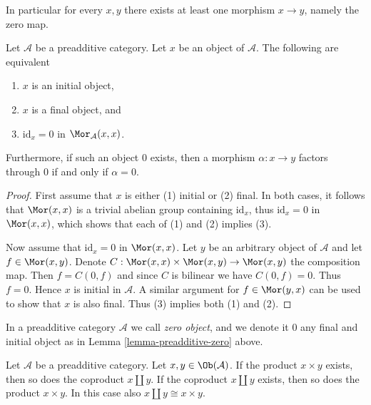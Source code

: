 \noindent
In particular for every $x, y$ there exists at least
one morphism $x \to y$, namely the zero map.

\begin{lemma}
\label{lemma-preadditive-zero}
Let $\mathcal{A}$ be a preadditive category.
Let $x$ be an object of $\mathcal{A}$.
The following are equivalent
\begin{enumerate}
\item $x$ is an initial object,
\item $x$ is a final object, and
\item $\text{id}_x = 0$ in $\Mor_\mathcal{A}(x, x)$.
\end{enumerate}
Furthermore, if such an object $0$ exists, then a morphism
$\alpha : x \to y$ factors through $0$ if and only if $\alpha = 0$.
\end{lemma}

\begin{proof}
First assume that $x$ is either (1) initial or (2) final.
In both cases, it follows that $\Mor(x,x)$ is a trivial abelian group
containing $\text{id}_x$, thus $\text{id}_x = 0$ in
$\Mor(x, x)$, which shows that each of (1) and (2) implies (3).

\medskip\noindent
Now assume that $\text{id}_x = 0$ in $\Mor(x,x)$. Let $y$
be an arbitrary object of $\mathcal{A}$ and let $f \in \Mor(x ,y)$.
Denote $C : \Mor(x,x) \times \Mor(x,y) \to \Mor(x,y)$ the composition map.
Then $f = C(0, f)$ and since $C$ is bilinear we have $C(0, f) = 0$.
Thus $f = 0$. Hence $x$ is initial in $\mathcal{A}$.
A similar argument for $f \in \Mor(y, x)$ can be used to show that
$x$ is also final. Thus (3) implies both (1) and (2).
\end{proof}

\begin{definition}
\label{definition-zero-object}
In a preadditive category $\mathcal{A}$ we call
{\it zero object}, and we denote it $0$
any final and initial object as in Lemma \ref{lemma-preadditive-zero} above.
\end{definition}

\begin{lemma}
\label{lemma-preadditive-direct-sum}
Let $\mathcal{A}$ be a preadditive category.
Let $x, y \in \Ob(\mathcal{A})$.
If the product $x \times y$ exists, then so does
the coproduct $x \amalg y$.
If the coproduct $x \amalg y$ exists, then so does
the product $x \times y$. In this case
also $x \amalg y \cong x \times y$.
\end{lemma}

